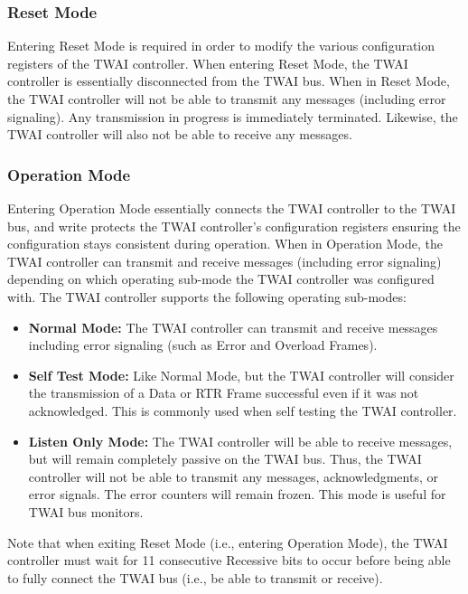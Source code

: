 \documentclass[main\_\_EN.tex]{subfiles}
\begin{document}
\subsubsection{Reset Mode}
Entering Reset Mode is required in order to modify the various configuration registers of the TWAI controller. When entering Reset Mode, the TWAI controller is essentially disconnected from the TWAI bus. When in Reset Mode, the TWAI controller will not be able to transmit any messages (including error signaling). Any transmission in progress is immediately terminated. Likewise, the TWAI controller will also not be able to receive any messages.

\subsubsection{Operation Mode}
Entering Operation Mode essentially connects the TWAI controller to the TWAI bus, and write protects the TWAI controller’s configuration registers ensuring the configuration stays consistent during operation. When in Operation Mode, the TWAI controller can transmit and receive messages (including error signaling) depending on which operating sub-mode the TWAI controller was configured with. The TWAI controller supports the following operating sub-modes:

\begin{itemize}
    \item {\bfseries Normal Mode:} The TWAI controller can transmit and receive messages including error signaling (such as Error and Overload Frames).
    \item {\bfseries Self Test Mode:} Like Normal Mode, but the TWAI controller will consider the transmission of a Data or RTR Frame successful even if it was not acknowledged. This is commonly used when self testing the TWAI controller.
    \item {\bfseries Listen Only Mode:} The TWAI controller will be able to receive messages, but will remain completely passive on the TWAI bus. Thus, the TWAI controller will not be able to transmit any messages, acknowledgments, or error signals. The error counters will remain frozen. This mode is useful for TWAI bus monitors.
\end{itemize}

Note that when exiting Reset Mode (i.e., entering Operation Mode), the TWAI controller must wait for 11 consecutive Recessive bits to occur before being able to fully connect the TWAI bus (i.e., be able to transmit or receive).
\end{document}
